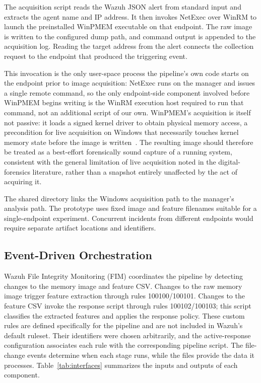 \documentclass[conference]{IEEEtran}
\begin{document}
The acquisition script reads the Wazuh JSON alert from standard input and extracts the agent name and IP address. It then invokes NetExec over WinRM to launch the preinstalled WinPMEM executable on that endpoint. The raw image is written to the configured dump path, and command output is appended to the acquisition log. Reading the target address from the alert connects the collection request to the endpoint that produced the triggering event.

This invocation is the only user-space process the pipeline's own code
starts on the endpoint prior to image acquisition: NetExec runs on the
manager and issues a single remote command, so the only endpoint-side
component involved before WinPMEM begins writing is the WinRM execution
host required to run that command, not an additional script of our own.
WinPMEM's acquisition is itself not passive: it loads a signed kernel
driver to obtain physical memory access, a precondition for live
acquisition on Windows that necessarily touches kernel memory state before
the image is written~\cite{winpmem}. The resulting image should therefore
be treated as a best-effort forensically sound capture of a running system,
consistent with the general limitation of live acquisition noted in the
digital-forensics literature, rather than a snapshot entirely unaffected by
the act of acquiring it.

The shared directory links the Windows acquisition path to the manager's analysis path. 
The prototype uses fixed image and feature filenames suitable for a single-endpoint experiment. Concurrent incidents from different endpoints would require separate artifact locations and identifiers.

\subsection{Event-Driven Orchestration}
Wazuh File Integrity Monitoring (FIM) coordinates the pipeline by detecting changes to the memory image and feature CSV. Changes to the raw memory image trigger feature extraction through rules 100100/100101. Changes to the feature CSV invoke the response script through rules 100102/100103; this script classifies the extracted features and applies the response policy. These custom rules are defined specifically for the pipeline and are not included in Wazuh's default ruleset. Their identifiers were chosen arbitrarily, and the active-response configuration associates each rule with the corresponding pipeline script. The file-change events determine when each stage runs, while the files provide the data it processes. Table~\ref{tab:interfaces} summarizes the inputs and
outputs of each component.
\end{document}
